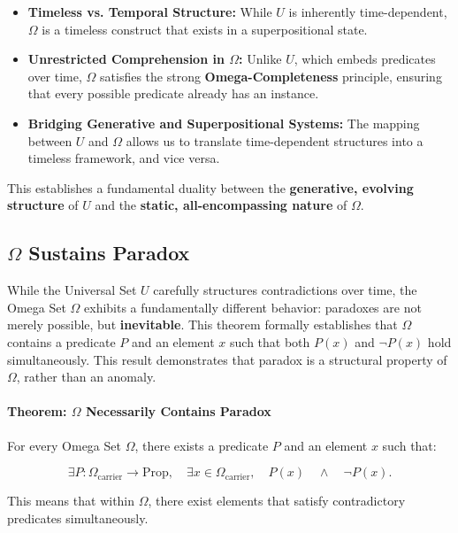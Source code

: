 \documentclass[12pt]{article}
\begin{document}
\begin{itemize}
    \item \textbf{Timeless vs. Temporal Structure:} While \( U \) is inherently time-dependent, \( \Omega \) is a timeless construct that exists in a superpositional state.
    \item \textbf{Unrestricted Comprehension in \( \Omega \):} Unlike \( U \), which embeds predicates over time, \( \Omega \) satisfies the strong \textbf{Omega-Completeness} principle, ensuring that every possible predicate already has an instance.
    \item \textbf{Bridging Generative and Superpositional Systems:} The mapping between \( U \) and \( \Omega \) allows us to translate time-dependent structures into a timeless framework, and vice versa.
\end{itemize}

This establishes a fundamental duality between the \textbf{generative, evolving structure} of \( U \) and the \textbf{static, all-encompassing nature} of \( \Omega \).


\subsection{\( \Omega \) Sustains Paradox}

While the Universal Set \( U \) carefully structures contradictions over time, the Omega Set \( \Omega \) exhibits a fundamentally different behavior: paradoxes are not merely possible, but \textbf{inevitable}. This theorem formally establishes that \( \Omega \) contains a predicate \( P \) and an element \( x \) such that both \( P(x) \) and \( \neg P(x) \) hold simultaneously. This result demonstrates that paradox is a structural property of \( \Omega \), rather than an anomaly.

\paragraph{Theorem: \( \Omega \) Necessarily Contains Paradox}
For every Omega Set \( \Omega \), there exists a predicate \( P \) and an element \( x \) such that:

\begin{equation}
    \exists P: \Omega_{\text{carrier}} \to \text{Prop}, \quad
    \exists x \in \Omega_{\text{carrier}}, \quad
    P(x) \quad \wedge \quad \neg P(x).
\end{equation}

This means that within \( \Omega \), there exist elements that satisfy contradictory predicates simultaneously.
\end{document}
